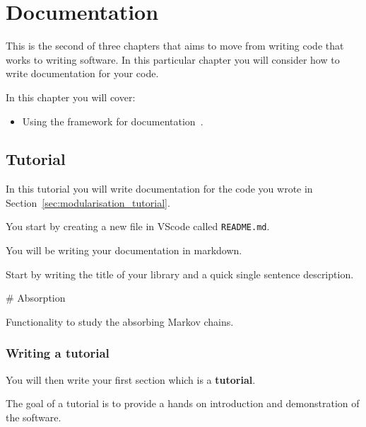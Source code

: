 \chapter{Documentation}
\label{chp:documentation} 

This is the second of three chapters that aims to move from writing code
that works to writing software. In this particular chapter you will consider how
to write documentation for your code.

\begin{note}
In this chapter you will cover:
\begin{itemize}
\item 

Using the  framework for
documentation~\cite{Procida_Diataxis_documentation_framework}.

\end{itemize}
\end{note}




\section{Tutorial}
\label{sec:documentation_tutorial}

In this tutorial you will write documentation for the code
you wrote in Section~\ref{sec:modularisation_tutorial}.


You start by creating a new file in VScode called \texttt{README.md}.

\begin{note}
You will be writing your documentation in markdown.
\end{note}


Start by writing the title of your library and a quick single sentence
description.

\begin{md}
# Absorption

Functionality to study the absorbing Markov chains.
\end{md}


\subsection{Writing a tutorial}
\label{\detokenize{building-tools/06-documentation/tutorial/main:writing-a-tutorial}}

You will then write your first section which is a \textbf{tutorial}.

\begin{note}
The goal of a tutorial is to provide a hands on introduction and demonstration
of the software.
\end{note}

